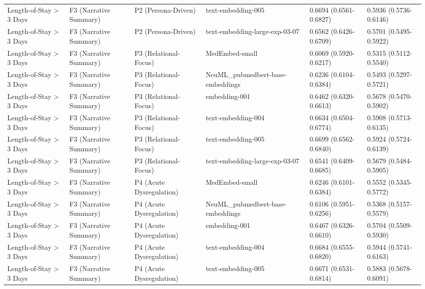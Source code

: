 \documentclass[border=0pt]{standalone}
\begin{document}
\begin{adjustbox}{width=\textwidth}
\begin{tabular}{llllll}
Length-of-Stay \textgreater{} 3 Days & F3 (Narrative Summary) & P2 (Persona-Driven) & text-embedding-005 & 0.6694 (0.6561-0.6827) & 0.5936 (0.5736-0.6146) \\
Length-of-Stay \textgreater{} 3 Days & F3 (Narrative Summary) & P2 (Persona-Driven) & text-embedding-large-exp-03-07 & 0.6562 (0.6426-0.6709) & 0.5701 (0.5495-0.5922) \\
Length-of-Stay \textgreater{} 3 Days & F3 (Narrative Summary) & P3 (Relational-Focus) & MedEmbed-small & 0.6069 (0.5920-0.6217) & 0.5315 (0.5112-0.5540) \\
Length-of-Stay \textgreater{} 3 Days & F3 (Narrative Summary) & P3 (Relational-Focus) & NeuML\_pubmedbert-base-embeddings & 0.6236 (0.6104-0.6384) & 0.5493 (0.5297-0.5721) \\
Length-of-Stay \textgreater{} 3 Days & F3 (Narrative Summary) & P3 (Relational-Focus) & embedding-001 & 0.6462 (0.6320-0.6613) & 0.5678 (0.5470-0.5902) \\
Length-of-Stay \textgreater{} 3 Days & F3 (Narrative Summary) & P3 (Relational-Focus) & text-embedding-004 & 0.6634 (0.6504-0.6774) & 0.5908 (0.5713-0.6135) \\
Length-of-Stay \textgreater{} 3 Days & F3 (Narrative Summary) & P3 (Relational-Focus) & text-embedding-005 & 0.6699 (0.6562-0.6840) & 0.5924 (0.5724-0.6139) \\
Length-of-Stay \textgreater{} 3 Days & F3 (Narrative Summary) & P3 (Relational-Focus) & text-embedding-large-exp-03-07 & 0.6541 (0.6409-0.6685) & 0.5679 (0.5484-0.5905) \\
Length-of-Stay \textgreater{} 3 Days & F3 (Narrative Summary) & P4 (Acute Dysregulation) & MedEmbed-small & 0.6246 (0.6101-0.6384) & 0.5552 (0.5345-0.5772) \\
Length-of-Stay \textgreater{} 3 Days & F3 (Narrative Summary) & P4 (Acute Dysregulation) & NeuML\_pubmedbert-base-embeddings & 0.6106 (0.5951-0.6256) & 0.5368 (0.5157-0.5579) \\
Length-of-Stay \textgreater{} 3 Days & F3 (Narrative Summary) & P4 (Acute Dysregulation) & embedding-001 & 0.6467 (0.6326-0.6610) & 0.5704 (0.5509-0.5930) \\
Length-of-Stay \textgreater{} 3 Days & F3 (Narrative Summary) & P4 (Acute Dysregulation) & text-embedding-004 & 0.6684 (0.6555-0.6820) & 0.5944 (0.5741-0.6163) \\
Length-of-Stay \textgreater{} 3 Days & F3 (Narrative Summary) & P4 (Acute Dysregulation) & text-embedding-005 & 0.6671 (0.6531-0.6814) & 0.5883 (0.5678-0.6091) \\

\end{tabular}
\end{adjustbox}
\end{document}
